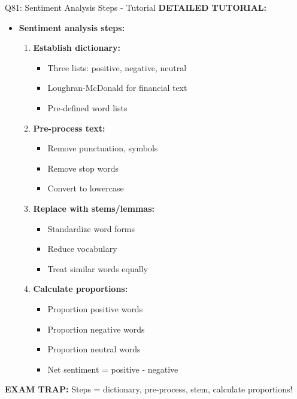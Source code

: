\documentclass[8pt]{beamer}
\begin{document}
\begin{frame}{Q81: Sentiment Analysis Steps - Tutorial}
		\vspace{0.1cm}
		\textbf{DETAILED TUTORIAL:}
		\begin{itemize}
			\item \textbf{Sentiment analysis steps:}
			\begin{enumerate}
				\item \textbf{Establish dictionary:}
				\begin{itemize}
					\item Three lists: positive, negative, neutral
					\item Loughran-McDonald for financial text
					\item Pre-defined word lists
				\end{itemize}
				\item \textbf{Pre-process text:}
				\begin{itemize}
					\item Remove punctuation, symbols
					\item Remove stop words
					\item Convert to lowercase
				\end{itemize}
				\item \textbf{Replace with stems/lemmas:}
				\begin{itemize}
					\item Standardize word forms
					\item Reduce vocabulary
					\item Treat similar words equally
				\end{itemize}
				\item \textbf{Calculate proportions:}
				\begin{itemize}
					\item Proportion positive words
					\item Proportion negative words
					\item Proportion neutral words
					\item Net sentiment = positive - negative
				\end{itemize}
			\end{enumerate}
		\end{itemize}
		
		\textcolor{myred}{\textbf{EXAM TRAP:}} Steps = \textcolor{myblue}{dictionary, pre-process, stem, calculate proportions}!
	\end{frame}
	
\end{document}
